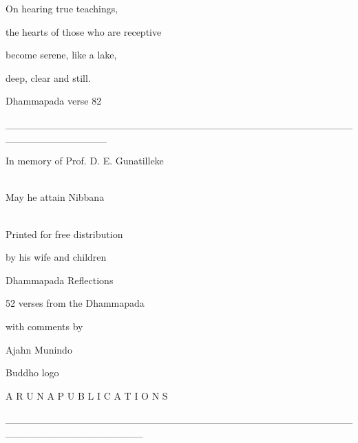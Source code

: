 \documentclass[a4paper,portrait,12pt]{article}
\begin{document}
\setlength{\oddsidemargin}{3.17cm-1in}
\setlength{\textwidth}{\paperwidth - 3.17cm-3.17cm}

On hearing true teachings,


the hearts of those who are receptive


become serene, like a lake,


deep, clear and still.





Dhammapada verse 82


\_\_\_\_\_\_\_\_\_\_\_\_\_\_\_\_\_\_\_\_\_\_\_\_\_\_\_\_\_\_\_\_\_\_\_\_\_\_\_\_\_\_\_\_\_\_\_\_\_\_\_\_\_\_\_\_\_\_\_\_\_\_





In memory of Prof. D. E. Gunatilleke


\\May he attain Nibbana


\\Printed for free distribution 


by his wife and children











Dhammapada Reflections





52 verses from the Dhammapada


with comments by





Ajahn Munindo

















Buddho logo








A R U N A   P U B L I C A T I O N S





\_\_\_\_\_\_\_\_\_\_\_\_\_\_\_\_\_\_\_\_\_\_\_\_\_\_\_\_\_\_\_\_\_\_\_\_\_\_\_\_\_\_\_\_\_\_\_\_\_\_\_\_\_\_\_\_\_\_\_\_\_\_\_\_\_\_\_
\end{document}
